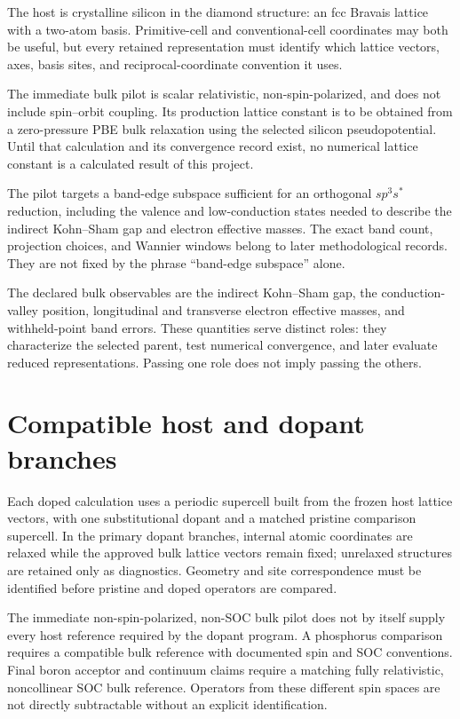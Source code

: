 The host is crystalline silicon in the diamond structure: an fcc Bravais
lattice with a two-atom basis. Primitive-cell and conventional-cell
coordinates may both be useful, but every retained representation must
identify which lattice vectors, axes, basis sites, and reciprocal-coordinate
convention it uses.

The immediate bulk pilot is scalar relativistic, non-spin-polarized, and does
not include spin--orbit coupling. Its production lattice constant is to be
obtained from a zero-pressure PBE bulk relaxation using the selected silicon
pseudopotential. Until that calculation and its convergence record exist, no
numerical lattice constant is a calculated result of this project.

The pilot targets a band-edge subspace sufficient for an orthogonal
$sp^3s^{\ast}$ reduction, including the valence and low-conduction states
needed to describe the indirect Kohn--Sham gap and electron effective masses.
The exact band count, projection choices, and Wannier windows belong to later
methodological records. They are not fixed by the phrase ``band-edge
subspace'' alone.

The declared bulk observables are the indirect Kohn--Sham gap, the
conduction-valley position, longitudinal and transverse electron effective
masses, and withheld-point band errors. These quantities serve distinct roles:
they characterize the selected parent, test numerical convergence, and later
evaluate reduced representations. Passing one role does not imply passing the
others.

\section{Compatible host and dopant branches}

Each doped calculation uses a periodic supercell built from the frozen host
lattice vectors, with one substitutional dopant and a matched pristine
comparison supercell. In the primary dopant branches, internal atomic
coordinates are relaxed while the approved bulk lattice vectors remain fixed;
unrelaxed structures are retained only as diagnostics. Geometry and site
correspondence must be identified before pristine and doped operators are
compared.

The immediate non-spin-polarized, non-SOC bulk pilot does not by itself supply
every host reference required by the dopant program. A phosphorus comparison
requires a compatible bulk reference with documented spin and SOC conventions.
Final boron acceptor and continuum claims require a matching fully relativistic,
noncollinear SOC bulk reference. Operators from these different spin spaces are
not directly subtractable without an explicit identification.

